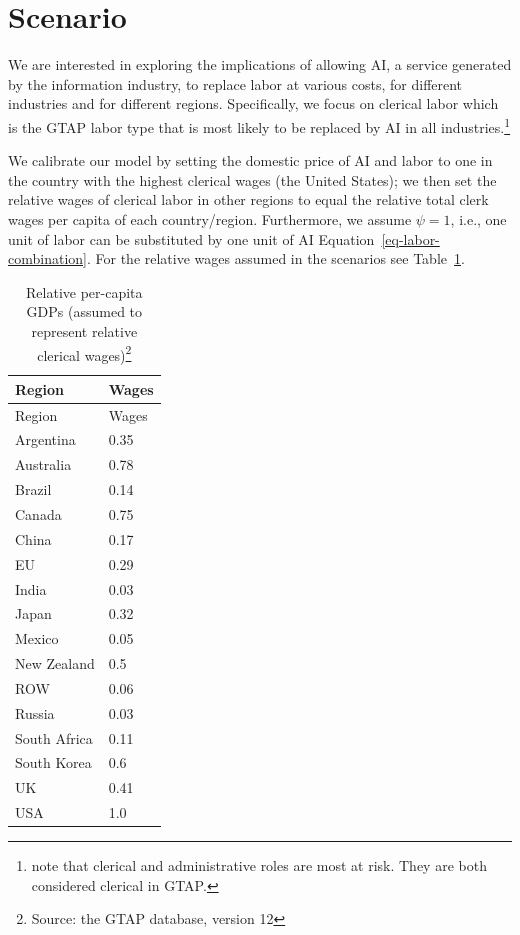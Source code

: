 \documentclass[
  authoryear,
  doubleblind]{elsarticle}
\begin{document}
\section{Scenario}\label{scenario}

We are interested in exploring the implications of allowing AI, a
service generated by the information industry, to replace labor at
various costs, for different industries and for different regions.
Specifically, we focus on clerical labor which is the GTAP labor type
that is most likely to be replaced by AI in all industries.\footnote{\citet{manning2026}
  note that clerical and administrative roles are most at risk. They are
  both considered clerical in GTAP.}

We calibrate our model by setting the domestic price of AI and labor to
one in the country with the highest clerical wages (the United States);
we then set the relative wages of clerical labor in other regions to
equal the relative total clerk wages per capita of each country/region.
Furthermore, we assume \(\psi=1\), i.e., one unit of labor can be
substituted by one unit of AI Equation~\ref{eq-labor-combination}. For
the relative wages assumed in the scenarios see Table~\ref{tbl-wages}.

\scriptsize

\begin{longtable}[]{@{}ll@{}}
\caption[Relative per-capita GDPs (assumed to represent relative
clerical wages) ]{Relative per-capita GDPs (assumed to represent
relative clerical wages)\footnote{Source: the GTAP database, version 12}
}\label{tbl-wages}\tabularnewline
\toprule\noalign{}
Region & Wages \\
\midrule\noalign{}
\endfirsthead
\toprule\noalign{}
Region & Wages \\
\midrule\noalign{}
\endhead
\bottomrule\noalign{}
\endlastfoot
Argentina & 0.35 \\
Australia & 0.78 \\
Brazil & 0.14 \\
Canada & 0.75 \\
China & 0.17 \\
EU & 0.29 \\
India & 0.03 \\
Japan & 0.32 \\
Mexico & 0.05 \\
New Zealand & 0.5 \\
ROW & 0.06 \\
Russia & 0.03 \\
South Africa & 0.11 \\
South Korea & 0.6 \\
UK & 0.41 \\
USA & 1.0 \\
\end{longtable}
\end{document}
